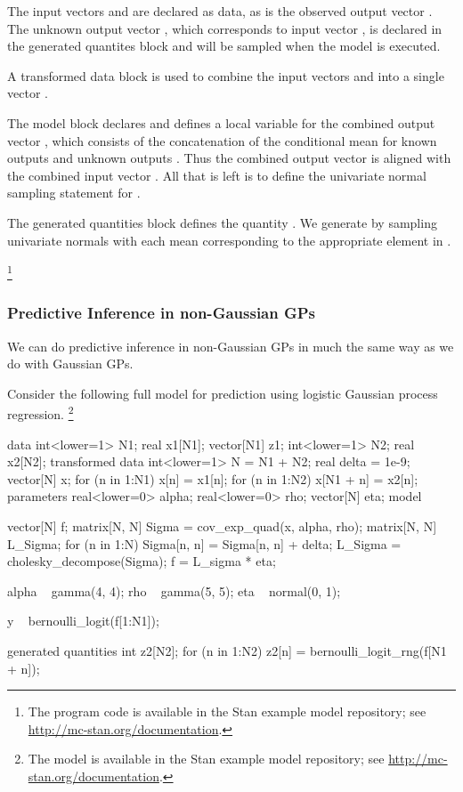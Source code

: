 The input vectors  and  are declared as data, as is the
observed output vector .  The unknown output vector , which
corresponds to input vector , is declared in the generated quantites
block and will be sampled when the model is executed.  

A transformed data block is used to combine the input vectors
 and  into a single vector . 

The model block declares and defines a local variable for the combined output
vector , which consists of the concatenation of the conditional mean
for known outputs  and unknown outputs .  Thus the
combined output vector  is aligned with the combined
input vector .  All that is left is to define the univariate
normal sampling statement for .

The generated quantities block defines the quantity . We generate
 by sampling  univariate normals with each mean corresponding
to the appropriate element in .

\footnote{The program code is available in the Stan example model repository;
see \url{http://mc-stan.org/documentation}.}
%

\subsubsection{Predictive Inference in non-Gaussian GPs}

We can do predictive inference in non-Gaussian GPs in much the 
same way as we do with Gaussian GPs.

Consider the following full model for prediction using logistic Gaussian
process regression.
%
\footnote{The model is available in the Stan example model repository;
see \url{http://mc-stan.org/documentation}.}
%
%
\begin{stancode}
data {
  int<lower=1> N1;     
  real x1[N1]; 
  vector[N1] z1;
  int<lower=1> N2;
  real x2[N2];
}
transformed data {
  int<lower=1> N = N1 + N2;
  real delta = 1e-9;
  vector[N] x;
  for (n in 1:N1) x[n] = x1[n];
  for (n in 1:N2) x[N1 + n] = x2[n];
}
parameters {
  real<lower=0> alpha;
  real<lower=0> rho;
  vector[N] eta;
}
model {
  vector[N] f;
  {
    matrix[N, N] Sigma = cov_exp_quad(x, alpha, rho);
    matrix[N, N] L_Sigma;
    for (n in 1:N)
      Sigma[n, n] = Sigma[n, n] + delta;
    L_Sigma = cholesky_decompose(Sigma);
    f = L_sigma * eta;
  }

  alpha ~ gamma(4, 4);
  rho ~ gamma(5, 5);
  eta ~ normal(0, 1);

  y ~ bernoulli_logit(f[1:N1]);
}
generated quantities {
  int z2[N2];
  for (n in 1:N2)
    z2[n] = bernoulli_logit_rng(f[N1 + n]);
}
\end{stancode}
%

